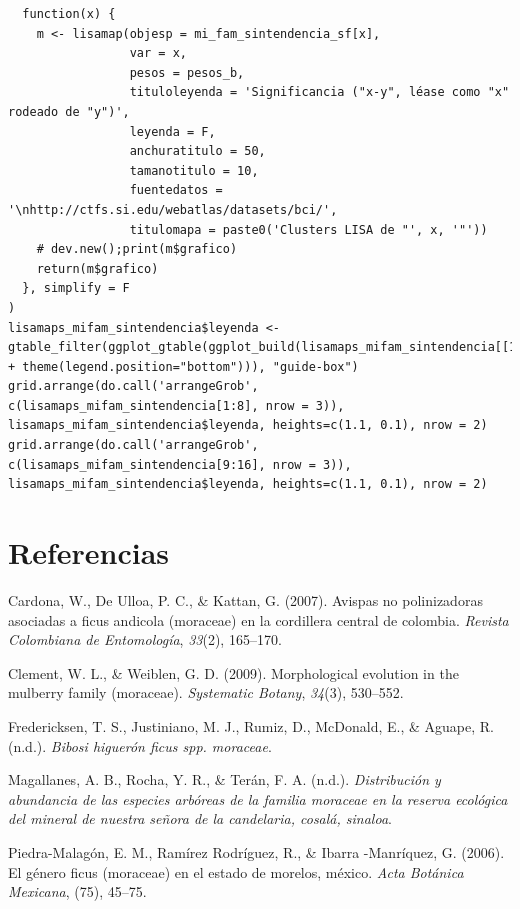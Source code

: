 \documentclass[11pt,]{article}
\begin{document}
\begin{verbatim}
  function(x) {
    m <- lisamap(objesp = mi_fam_sintendencia_sf[x],
                 var = x,
                 pesos = pesos_b,
                 tituloleyenda = 'Significancia ("x-y", léase como "x" rodeado de "y")',
                 leyenda = F,
                 anchuratitulo = 50,
                 tamanotitulo = 10,
                 fuentedatos = '\nhttp://ctfs.si.edu/webatlas/datasets/bci/',
                 titulomapa = paste0('Clusters LISA de "', x, '"'))
    # dev.new();print(m$grafico)
    return(m$grafico)
  }, simplify = F
)
lisamaps_mifam_sintendencia$leyenda <- gtable_filter(ggplot_gtable(ggplot_build(lisamaps_mifam_sintendencia[[1]] + theme(legend.position="bottom"))), "guide-box")
grid.arrange(do.call('arrangeGrob', c(lisamaps_mifam_sintendencia[1:8], nrow = 3)), lisamaps_mifam_sintendencia$leyenda, heights=c(1.1, 0.1), nrow = 2)
grid.arrange(do.call('arrangeGrob', c(lisamaps_mifam_sintendencia[9:16], nrow = 3)), lisamaps_mifam_sintendencia$leyenda, heights=c(1.1, 0.1), nrow = 2)
\end{verbatim}

\section*{Referencias}\label{referencias}

\hypertarget{refs}{}
\hypertarget{ref-cardona2007avispas}{}
Cardona, W., De Ulloa, P. C., \& Kattan, G. (2007). Avispas no
polinizadoras asociadas a ficus andicola (moraceae) en la cordillera
central de colombia. \emph{Revista Colombiana de Entomología},
\emph{33}(2), 165--170.

\hypertarget{ref-clement2009morphological}{}
Clement, W. L., \& Weiblen, G. D. (2009). Morphological evolution in the
mulberry family (moraceae). \emph{Systematic Botany}, \emph{34}(3),
530--552.

\hypertarget{ref-fredericksenbibosi}{}
Fredericksen, T. S., Justiniano, M. J., Rumiz, D., McDonald, E., \&
Aguape, R. (n.d.). \emph{Bibosi higuerón ficus spp. moraceae}.

\hypertarget{ref-magallanes1972distribucion}{}
Magallanes, A. B., Rocha, Y. R., \& Terán, F. A. (n.d.).
\emph{Distribución y abundancia de las especies arbóreas de la familia
moraceae en la reserva ecológica del mineral de nuestra señora de la
candelaria, cosalá, sinaloa}.

\hypertarget{ref-piedra2006genero}{}
Piedra-Malagón, E. M., Ramírez Rodríguez, R., \& Ibarra -Manríquez, G.
(2006). El género ficus (moraceae) en el estado de morelos, méxico.
\emph{Acta Botánica Mexicana}, (75), 45--75.
\end{document}
